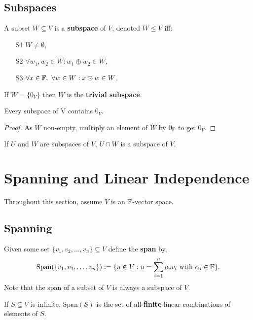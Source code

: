 \documentclass[../Year1.tex]{subfiles}
\begin{document}
\subsection{Subspaces}
\begin{definition}[Subspace]
    A subset $W\subseteq V$ is a \textbf{subspace} of $V$, denoted $W\leq V$ iff:
    \begin{enumerate}
        \item[S1] $W\neq \emptyset$,
        \item[S2] $\forall w_1, w_2 \in W: w_1 \oplus w_2\in W$,
        \item[S3] $\forall x\in\mathbb{F}, \  \forall w\in W: x\odot w\in W$.
    \end{enumerate}
    If $W=\{0_V\}$ then $W$ is the \textbf{trivial subspace}.
\end{definition}

\begin{theorem}
    Every subspace of V contains $0_V$.
    \begin{proof}
        As $W$ non-empty, multiply an element of $W$ by $0_{\mathbb{F}}$ to get $0_V$.
    \end{proof}
\end{theorem}

\begin{theorem}
    If $U$ and $W$ are subspaces of $V$, $U\cap W$ is a subspace of $V$.
\end{theorem}

\section{Spanning and Linear Independence}
Throughout this section, assume $V$ is an $\mathbb{F}$-vector space.
\subsection{Spanning}
\begin{definition}[Span]
    Given some set $\{v_1,v_2,\ldots,v_n\}\subseteq V$ define the \textbf{span} by, \[
    \text{Span}(\{v_1,v_2,\ldots,v_n\}):=\{u\in V: u = \sum_{i=1}^n\alpha_i v_i \ \text{\textcolor{black}{ with }}\alpha_i\in\mathbb{F}\}\textcolor{black}{.}
    \]
    Note that the span of a subset of $V$ is always a subspace of $V$.
\end{definition}

\begin{remark}
    If $S\subseteq V$ is infinite, $\text{Span}(S)$ is the set of all \textbf{finite} linear combinations of elements of $S$.
\end{remark}
\end{document}
